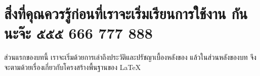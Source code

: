 \chapter{สิ่งที่คุณควรรู้ก่อนที่เราจะเริ่มเรียนการใช้งาน \LaTeXe กัน นะจ๊ะ ๕๕๕ 666 777
888}
ส่วนแรกของบทนี้ เราจะเริ่มด้วยการเล่าถึงประวัติและปรัชญาเบื้องหลังของ \LaTeXe
แล้วในส่วนหลังของบท จึงจะตามด้วยเรื่องเกี่ยวกับโครงสร้างพื้นฐานของ \LaTeX
